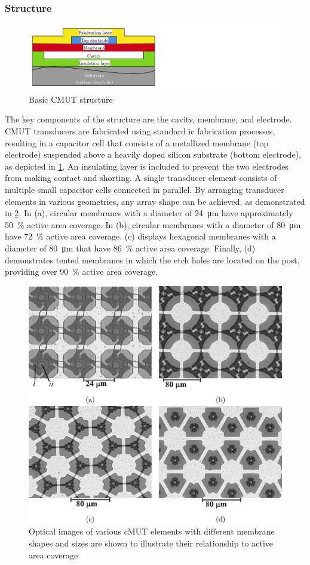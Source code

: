 \subsubsection{Structure}
\begin{figure}[htbp]
	\centering
	\includegraphics[width=.6\textwidth]{Figures/3_cmut_structure.pdf}
	\caption{Basic CMUT structure}
	\label{fig:3_cmut_structure}
\end{figure}
The key components of the structure are the cavity, membrane, and electrode. CMUT transducers are fabricated using standard \gls{ic} fabrication processes, resulting in a capacitor cell that consists of a metallized membrane (top electrode) suspended above a heavily doped silicon substrate (bottom electrode), as depicted in \cref{fig:3_cmut_structure}. An insulating layer is included to prevent the two electrodes from making contact and shorting. A single transducer element consists of multiple small capacitor cells connected in parallel. By arranging transducer elements in various geometries, any array shape can be achieved, as demonstrated in \cref{fig:3_cmut_array_shape}. In (a), circular membranes with a diameter of \qty{24}{\micro\meter} have approximately \qty{50}{\percent} active area coverage. In (b), circular membranes with a diameter of \qty{80}{\micro\meter} have \qty{72}{\percent} active area coverage. (c) displays hexagonal membranes with a diameter of \qty{80}{\micro\meter} that have \qty{86}{\percent} active area coverage. Finally, (d) demonstrates tented membranes in which the etch holes are located on the post, providing over \qty{90}{\percent} active area coverage.

\begin{figure}[htbp]
	\centering
	\includegraphics[width=.6\textwidth]{Figures/3_cmut_array_shapes.jpg}
	\caption[Optical images of various cMUT elements with different membrane shapes]{Optical images of various cMUT elements with different membrane shapes and sizes are shown to illustrate their relationship to active area coverage \cite{cmut_array_shape}}
	\label{fig:3_cmut_array_shape}
\end{figure}

